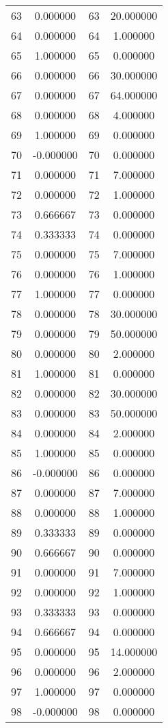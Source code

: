 \documentclass[12pt]{article}
\begin{document}
\begin{longtable}{@{}cccc@{}}
63 & 0.000000 & 63 & 20.000000 \\
64 & 0.000000 & 64 & 1.000000 \\
65 & 1.000000 & 65 & 0.000000 \\
66 & 0.000000 & 66 & 30.000000 \\
67 & 0.000000 & 67 & 64.000000 \\
68 & 0.000000 & 68 & 4.000000 \\
69 & 1.000000 & 69 & 0.000000 \\
70 & -0.000000 & 70 & 0.000000 \\
71 & 0.000000 & 71 & 7.000000 \\
72 & 0.000000 & 72 & 1.000000 \\
73 & 0.666667 & 73 & 0.000000 \\
74 & 0.333333 & 74 & 0.000000 \\
75 & 0.000000 & 75 & 7.000000 \\
76 & 0.000000 & 76 & 1.000000 \\
77 & 1.000000 & 77 & 0.000000 \\
78 & 0.000000 & 78 & 30.000000 \\
79 & 0.000000 & 79 & 50.000000 \\
80 & 0.000000 & 80 & 2.000000 \\
81 & 1.000000 & 81 & 0.000000 \\
82 & 0.000000 & 82 & 30.000000 \\
83 & 0.000000 & 83 & 50.000000 \\
84 & 0.000000 & 84 & 2.000000 \\
85 & 1.000000 & 85 & 0.000000 \\
86 & -0.000000 & 86 & 0.000000 \\
87 & 0.000000 & 87 & 7.000000 \\
88 & 0.000000 & 88 & 1.000000 \\
89 & 0.333333 & 89 & 0.000000 \\
90 & 0.666667 & 90 & 0.000000 \\
91 & 0.000000 & 91 & 7.000000 \\
92 & 0.000000 & 92 & 1.000000 \\
93 & 0.333333 & 93 & 0.000000 \\
94 & 0.666667 & 94 & 0.000000 \\
95 & 0.000000 & 95 & 14.000000 \\
96 & 0.000000 & 96 & 2.000000 \\
97 & 1.000000 & 97 & 0.000000 \\
98 & -0.000000 & 98 & 0.000000 \\

\end{longtable}
\end{document}
